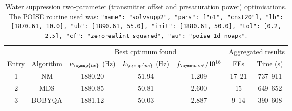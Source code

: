 \begin{table}
    \centering
    \begin{tabular}{ccccccc}
        \toprule
              &           & \multicolumn{3}{c}{Best optimum found} & \multicolumn{2}{c}{Aggregated results} \\
                            \cmidrule(lr){3-5}                       \cmidrule(lr){6-7}
        Entry & Algorithm & $\nu_{\symup{tx}}$ (\unit{\Hz}) & $k_{\symup{ps}}$ (\unit{\Hz}) & $\fsosre / 10^{18}$ & FEs    & Time (\unit{\s}) \\
        \midrule
        1     & NM        & 1880.20                    & 51.94          & 1.209                    & 17--21 & 737--911       \\
        2     & MDS       & 1880.85                    & 50.81          & 2.600                    & 15     & 649--652       \\
        3     & BOBYQA    & 1881.12                    & 50.03          & 2.887                    & 9--14  & 390--608       \\
        \bottomrule
    \end{tabular}
    \caption[Water suppression two-parameter optimisations]{
        Water suppression two-parameter (transmitter offset and presaturation power) optimisations.
        The POISE routine used was: \texttt{{"name": "solvsupp2", "pars": ["o1", "cnst20"], "lb": [1870.61, 10.0], "ub": [1890.61, 55.0], "init": [1880.61, 50.0], "tol": [0.2, 2.5], "cf": "zerorealint_squared", "au": "poise_1d_noapk"}}.
    }
    \label{tbl:poise_solvsupp2p}
\end{table}

